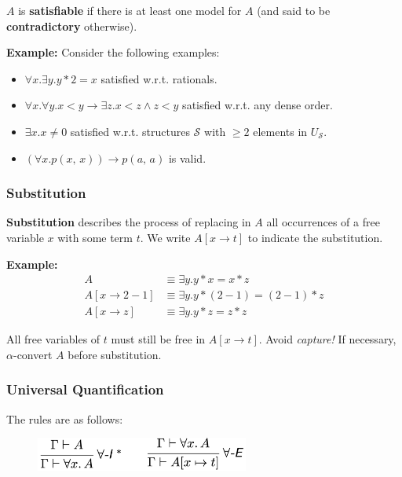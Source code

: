 \documentclass[a4paper]{extarticle}
\begin{document}
\(A\) is \textbf{satisfiable} if there is at least one model for \(A\) (and said to be \textbf{contradictory} otherwise).

\begin{ebox}
    \textbf{Example:} Consider the following examples:

    \begin{itemize}
        \item \(\forall x. \exists y. y*2 = x\) satisfied w.r.t. rationals.
        \item \(\forall x. \forall y. x < y \to \exists z.x < z \land z < y\) satisfied w.r.t. any dense order.
        \item \(\exists x . x \neq 0\) satisfied w.r.t. structures \(\mathcal{S}\) with \(\geq 2\) elements in \(U_{\mathcal{S}}\).
        \item \((\forall x . p(x, \, x)) \to p(a, \, a)\) is valid.
    \end{itemize}
\end{ebox}

\subsubsection{Substitution}

\textbf{Substitution} describes the process of replacing in \(A\) all occurrences of a free variable \(x\) with some term \(t\). We write \(A[x \to t]\) to indicate the substitution.

\begin{ebox}
    \textbf{Example:}
    \begin{align*}
        A &\equiv \exists y . y * x = x * z \\
        A[x \to 2 - 1] &\equiv \exists y . y * (2 - 1) = (2 - 1) * z \\
        A[x \to z] &\equiv \exists y . y * z = z * z
    \end{align*}
\end{ebox}

All free variables of \(t\) must still be free in \(A[x \to t]\). Avoid \textit{capture!} If necessary, \(\alpha\)-convert \(A\) before substitution.

\subsubsection{Universal Quantification}

The rules are as follows:

\begin{figure}[H]
    \includegraphics[width=7cm]{../images/FMFP_Fig2-2}
    \centering
\end{figure}
\end{document}
